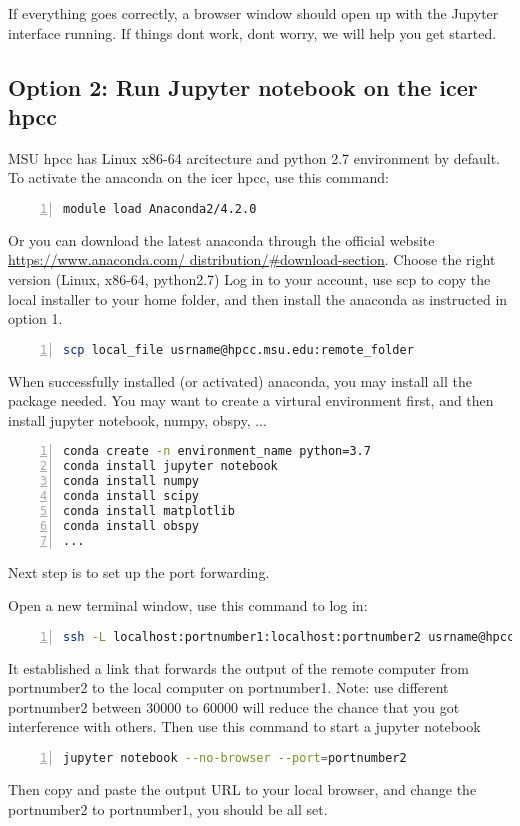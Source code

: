 \documentclass[12pt]{article}   	%
\begin{document}
If everything goes correctly, a browser window should open up with the Jupyter interface running. If things don\textquotesingle t work, don\textquotesingle t worry, we will help you get started.

\subsection*{Option 2: Run Jupyter notebook on the icer hpcc}
MSU hpcc has Linux x86-64 arcitecture and python 2.7 environment by default. To activate the anaconda on the icer hpcc, use this command:
\begin{lstlisting}[language=bash, numbers=left, numberstyle=\tiny,keywordstyle=\color{blue!70},basicstyle=\ttfamily]
module load Anaconda2/4.2.0
\end{lstlisting}
Or you can download the latest anaconda through the official website \href{https://www.anaconda.com/distribution/#download-section}{https://www.anaconda.com/ distribution/#download-section}. Choose the right version (Linux, x86-64, python2.7) Log in to your account, use scp to copy the local installer to your home folder, and then install the anaconda as instructed in option 1.
\begin{lstlisting}[language=bash, numbers=left, numberstyle=\tiny,keywordstyle=\color{blue!70},basicstyle=\ttfamily]
scp local_file usrname@hpcc.msu.edu:remote_folder
\end{lstlisting}
When successfully installed (or activated) anaconda, you may install all the package needed. You may want to create a virtural environment first, and then install jupyter notebook, numpy, obspy, ...
 \begin{lstlisting}[language=bash, numbers=left, numberstyle=\tiny,keywordstyle=\color{blue!70},basicstyle=\ttfamily]
conda create -n environment_name python=3.7
conda install jupyter notebook
conda install numpy
conda install scipy
conda install matplotlib
conda install obspy
...
 \end{lstlisting}
Next step is to set up the port forwarding.

Open a new terminal window, use this command to log in:
\begin{lstlisting}[language=bash, numbers=left, numberstyle=\tiny,keywordstyle=\color{blue!70},basicstyle=\ttfamily]
ssh -L localhost:portnumber1:localhost:portnumber2 usrname@hpcc.msu.edu
 \end{lstlisting}
It established a link that forwards the output of the remote computer from portnumber2 to the local computer on portnumber1. Note: use different portnumber2 between 30000 to 60000 will reduce the chance that you got interference with others. Then use this command to start a jupyter notebook
\begin{lstlisting}[language=bash, numbers=left, numberstyle=\tiny,keywordstyle=\color{blue!70},basicstyle=\ttfamily]
jupyter notebook --no-browser --port=portnumber2
 \end{lstlisting}
Then copy and paste the output URL to your local browser, and change the portnumber2 to portnumber1, you should be all set.
\end{document}
